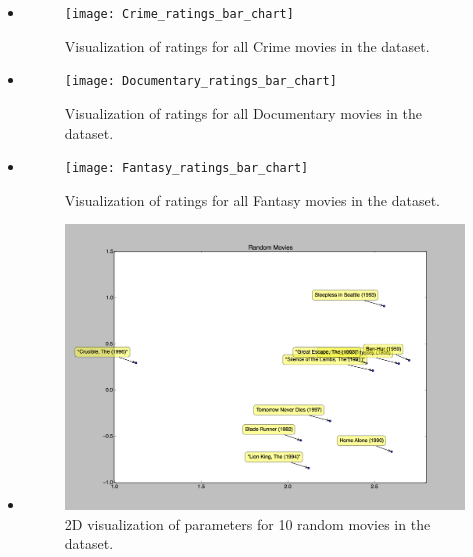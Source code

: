 \begin{itemize}
    \pagebreak
    \item {}

    \begin{figure}[H]
    \centering
    \texttt{[image: Crime\_ratings\_bar\_chart]}
    \caption{Visualization of ratings for all Crime movies in the dataset.}
    \end{figure}

    \pagebreak
    \item {}

    \begin{figure}[H]
    \centering
    \texttt{[image: Documentary\_ratings\_bar\_chart]}
    \caption{Visualization of ratings for all Documentary movies in the dataset.}
    \end{figure}


    \pagebreak
    \item {}

    \begin{figure}[H]
    \centering
    \texttt{[image: Fantasy\_ratings\_bar\_chart]}
    \caption{Visualization of ratings for all Fantasy movies in the dataset.}
    \end{figure}











    \pagebreak
    \item {}

    \begin{figure}[H]
    \centering
    \includegraphics[width=\textwidth]{random_2d_vis}
    \caption{2D visualization of parameters for 10 random movies in the dataset.}
    \end{figure}



\end{itemize}
